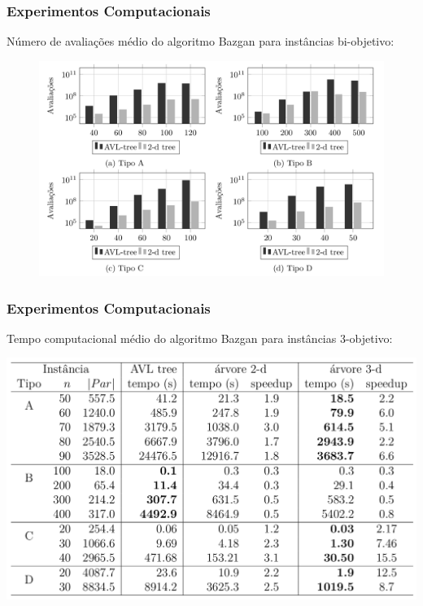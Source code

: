 \documentclass[10pt,xcolor=table,fleqn]{beamer}
\begin{document}
\begin{frame}
  \frametitle{Experimentos Computacionais}
  Número de avaliações médio do algoritmo Bazgan para instâncias bi-objetivo:
  \begin{figure}[H]
    \includegraphics[scale=0.3]{../tab/cmp/2dim}
  \end{figure}
\end{frame}

\begin{frame}
  \frametitle{Experimentos Computacionais}
  Tempo computacional médio do algoritmo Bazgan para instâncias $3$-objetivo:
  \scriptsize
  \begin{table}[h]
    \includegraphics[scale=0.25]{../tab/cpu3dim}
  \end{table}
\end{frame}
\end{document}
